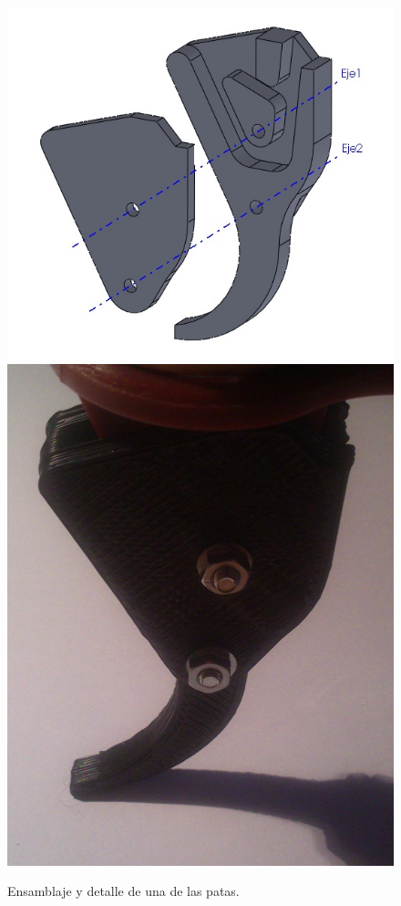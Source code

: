 \documentclass[twoside,11pt]{report}
\begin{document}
\begin{figure}[h!]
\begin{center}
\includegraphics[scale=0.32]{images/ensamblaje_pata.jpg} \hspace{1.5cm}
\includegraphics[scale=0.12]{images/detalle_pata.jpeg}
\end{center}
\caption{Ensamblaje y detalle de una de las patas.}
\end{figure}
\end{document}
